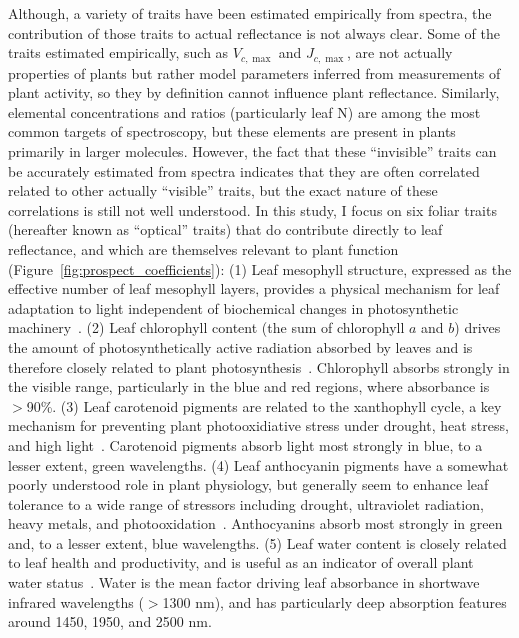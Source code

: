 Although, a variety of traits have been estimated empirically from spectra, the contribution of those traits to actual reflectance is not always clear.
Some of the traits estimated empirically, such as $V_{c,\max}$ and $J_{c,\max}$, are not actually properties of plants but rather model parameters inferred from measurements of plant activity, so they by definition cannot influence plant reflectance.
Similarly, elemental concentrations and ratios (particularly leaf N) are among the most common targets of spectroscopy, but these elements are present in plants primarily in larger molecules.
However, the fact that these ``invisible'' traits can be accurately estimated from spectra indicates that they are often correlated related to other actually ``visible'' traits, but the exact nature of these correlations is still not well understood.
In this study, I focus on six foliar traits (hereafter known as ``optical'' traits) that do contribute directly to leaf reflectance, and which are themselves relevant to plant function (Figure~\ref{fig:prospect_coefficients}):
(1) Leaf mesophyll structure, expressed as the effective number of leaf mesophyll layers, provides a physical mechanism for leaf adaptation to light independent of biochemical changes in photosynthetic machinery~\cite{ivanov_2016_photosynthesis,schollert_2017_leaf}.
(2) Leaf chlorophyll content (the sum of chlorophyll $a$ and $b$) drives the amount of photosynthetically active radiation absorbed by leaves and is therefore closely related to plant photosynthesis~\cite{croft_2017_chlorophyll}.
Chlorophyll absorbs strongly in the visible range, particularly in the blue and red regions, where absorbance is $>$90\%.
(3) Leaf carotenoid pigments are related to the xanthophyll cycle, a key mechanism for preventing plant photooxidiative stress under drought, heat stress, and high light~\cite{ruban_2007_identifcation}.
Carotenoid pigments absorb light most strongly in blue, to a lesser extent, green wavelengths.
(4) Leaf anthocyanin pigments have a somewhat poorly understood role in plant physiology, but generally seem to enhance leaf tolerance to a wide range of stressors including drought, ultraviolet radiation, heavy metals, and photooxidation~\cite{gould_2004_nature}.
Anthocyanins absorb most strongly in green and, to a lesser extent, blue wavelengths.
(5) Leaf water content is closely related to leaf health and productivity, and is useful as an indicator of overall plant water status~\cite{penuelas_1994_reflectance,kramer_1995_water,cheng_2011_spectroscopic,chavana_bryant_2016_leaf}.
Water is the mean factor driving leaf absorbance in shortwave infrared wavelengths ($>$1300 nm), and has particularly deep absorption features around 1450, 1950, and 2500 nm.
